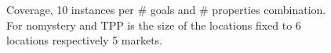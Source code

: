 \begin{figure}[ht]
\begin{tabular}{l|r|rrrrrrrrrr}
	\end{tabular}
	\caption{Coverage, 10 instances per \# goals and \# properties combination.
	For nomystery and TPP is the size of the locations fixed to 6 locations respectively 5 markets.}
\end{figure}


